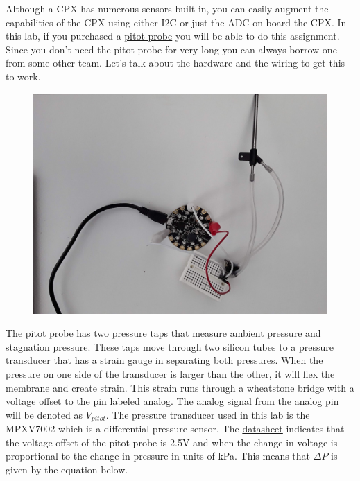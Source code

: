 Although a CPX has numerous sensors built in, you can easily augment the capabilities of the CPX using either I2C or just the ADC on board the CPX. In this lab, if you purchased a \href{https://www.amazon.com/Hobbypower-Airspeed-MPXV7002DP-Differential-controller/dp/B00WSFWO36/ref=sr_1_3?dchild=1&keywords=Airspeed+sensor+kit&qid=1590532161&sr=8-3}{pitot probe} you will be able to do this assignment. Since you don’t need the pitot probe for very long you can always borrow one from some other team. Let’s talk about the hardware and the wiring to get this to work.
\begin{figure}[H]
  \begin{center}
    \includegraphics[width=\textwidth]{Figures/pitot_probe_circuit.jpeg}
  \end{center}
\end{figure}
The pitot probe has two pressure taps that measure ambient pressure and stagnation pressure. These taps move through two silicon tubes to a pressure transducer that has a strain gauge in separating both pressures. When the pressure on one side of the transducer is larger than the other, it will flex the membrane and create strain. This strain runs through a wheatstone bridge with a voltage offset to the pin labeled analog. The analog signal from the analog pin will be denoted as $V_{pitot}$. The pressure transducer used in this lab is the MPXV7002 which is a differential pressure sensor. The \href{https://www.nxp.com/docs/en/data-sheet/MPXV7002.pdf}{datasheet} indicates that the voltage offset of the pitot probe is 2.5V and when the change in voltage is proportional to the change in pressure in units of kPa. This means that $\Delta P$ is given by the equation below.

